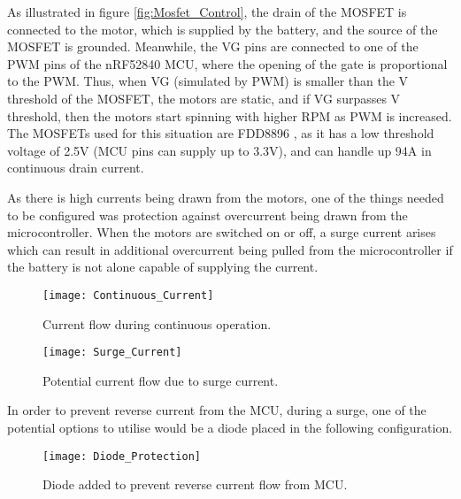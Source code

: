 \documentclass[12pt]{article}
\begin{document}
As illustrated in figure \ref{fig:Mosfet_Control}, the drain of the MOSFET is connected to the motor, which is supplied by 
the battery, and the source of the MOSFET is grounded. Meanwhile, the VG pins are connected to one of the PWM pins 
of the nRF52840 MCU, where the opening of the gate is proportional to the PWM. Thus, when VG (simulated by PWM) is 
smaller than the V threshold of the MOSFET, the motors are static, and if VG surpasses V threshold, then the motors 
start spinning with higher RPM as PWM is increased. 
The MOSFETs used for this situation are FDD8896 \cite{FDD8896}, as it has 
a low threshold voltage of 2.5V (MCU pins can supply 
up to 3.3V), and can handle up 94A in continuous drain 
current.

As there is high currents being drawn from the motors, one of the things needed to be configured was protection 
against overcurrent being drawn from the microcontroller. When the motors are switched on or off, 
a surge current arises which can result in additional overcurrent being pulled from the microcontroller if 
the battery is not alone capable of supplying the current. 

\begin{figure}[H]
    \begin{center}
    \texttt{[image: Continuous\_Current]}
    \end{center}
    \caption{Current flow during continuous operation.}
    \label{fig:Continuous_Current}
\end{figure}

\begin{figure}[H]
    \begin{center}
    \texttt{[image: Surge\_Current]}
    \end{center}
    \caption{Potential current flow due to surge current.}
    \label{fig:Surge_Current}
\end{figure}

In order to prevent reverse current from the MCU, 
during a surge, one of the potential options to utilise would be a diode placed in the following 
configuration. 

\begin{figure}[H]
    \begin{center}
    \texttt{[image: Diode\_Protection]}
    \end{center}
    \caption{Diode added to prevent reverse current flow from MCU.}
    \label{fig:Diode_Protection}
\end{figure}
\end{document}
